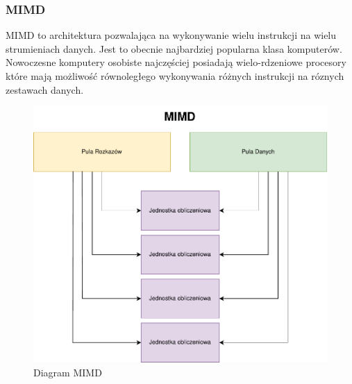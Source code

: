 \documentclass[a4paper,12pt]{book} %
\begin{document}
\subsubsection {MIMD}
MIMD to architektura pozwalająca na wykonywanie wielu instrukcji na wielu strumieniach danych. Jest to obecnie najbardziej popularna klasa komputerów. Nowoczesne komputery osobiste najczęściej posiadają wielo-rdzeniowe procesory które mają możliwość równoległego wykonywania różnych instrukcji na róznych zestawach danych.
\begin{figure}[h]
	\centering
	\includegraphics[scale=0.7]{assets/MIMD.pdf}
	\caption{Diagram MIMD}
	\label{MIMD}
\end{figure}

\newpage
\end{document}
